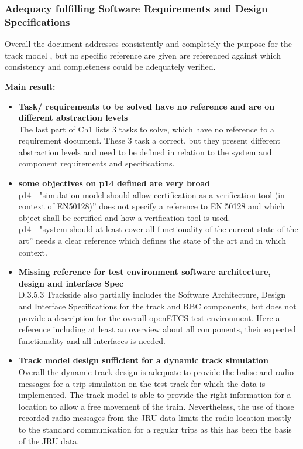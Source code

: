 \documentclass{article}
\begin{document}
\subsubsection{Adequacy fulfilling Software Requirements and Design Specifications}

Overall the document addresses consistently and completely the purpose for the track model , but no specific reference are given are referenced against which consistency and completeness could be adequately verified.

\textbf{Main result:}

\begin{itemize}
\item\textbf{ Task/ requirements to be solved have no reference and are on different abstraction levels}\\
The last part of Ch1 lists 3 tasks to solve, which have no reference to a requirement document. These 3 task a correct, but they present different abstraction levels and need to be defined in relation to the system and component requirements and specifications.
\item \textbf{some objectives on p14 defined are very broad}\\
 p14 - "simulation model should allow certification as a verification tool (in context of EN50128)'' does not specify a reference to EN 50128 and which object shall be certified and how a verification tool is used.\\
p14 - "system should at least cover all functionality of the current state of the art'' needs a clear reference which defines the state of the art and in which context.
\item \textbf{Missing reference for test environment software architecture, design and interface Spec}\\ 
D.3.5.3 Trackside also partially includes the Software Architecture, Design and Interface Specifications for the track and RBC components, but does not provide a description for the overall openETCS test environment. Here a reference including at least an overview about all components, their expected functionality and all interfaces is needed. 
\item \textbf{Track model design sufficient for a dynamic track simulation}\\
Overall the dynamic track design is adequate to provide the balise and radio messages for a trip simulation on the test track for which the data is implemented. The track model is able to provide the right information for a location to allow a free movement of the train. Nevertheless, the use of those recorded radio messages from the JRU data limits the radio location mostly to the standard communication for a regular trips as this has been the basis of the JRU data.

\end{itemize}
\end{document}
